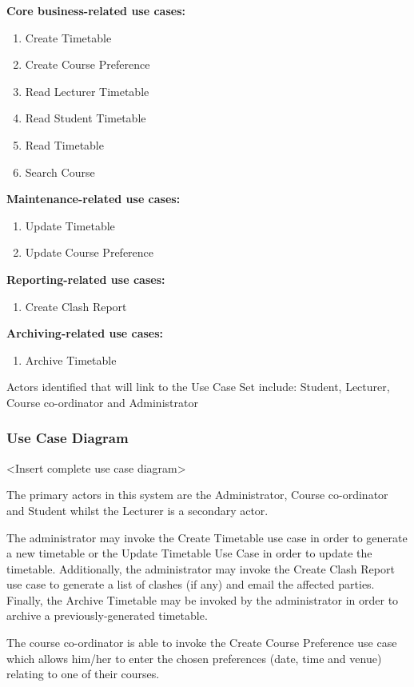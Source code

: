 \documentclass{article}
\begin{document}
\textbf{Core business-related use cases:}
\begin{enumerate}[nosep]
\item Create Timetable
\item Create Course Preference
\item Read Lecturer Timetable
\item Read Student Timetable 
\item Read Timetable
\item Search Course
\end{enumerate}

\textbf{Maintenance-related use cases:}
\begin{enumerate}
\item Update Timetable
\item Update Course Preference
\end{enumerate}

\textbf{Reporting-related use cases:}
\begin{enumerate}
\item Create Clash Report
\end{enumerate}

\textbf{Archiving-related use cases:}
\begin{enumerate}
\item Archive Timetable
\end{enumerate}

Actors identified that will link to the Use Case Set include: Student, Lecturer, Course co-ordinator and Administrator

\subsubsection{Use Case Diagram}
<Insert complete use case diagram>

The primary actors in this system are the Administrator, Course co-ordinator and Student whilst the Lecturer is a secondary actor. 

The administrator may invoke the Create Timetable use case in order to generate a new timetable or the Update Timetable Use Case in order to update the timetable. Additionally, the administrator may invoke the Create Clash Report use case to generate a list of clashes (if any) and email the affected parties. Finally, the Archive Timetable may be invoked by the administrator in order to archive a previously-generated timetable.

The course co-ordinator is able to invoke the Create Course Preference use case which allows him/her to enter the chosen preferences (date, time and venue) relating to one of their courses.
\end{document}
